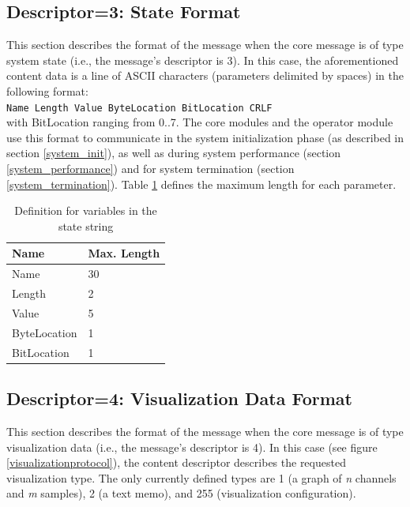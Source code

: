 \documentclass[letterpaper,oneside,12pt]{book}
\newcommand{\todo}[1]{}
\begin{document}
\todo{Describe proposal for parameter data type for state definition, e.g.,
TargetCode 1 Feedback 1}

\subsection{Descriptor=3: State Format}
\label{state_format}

This section describes the format of the message when the core message is of 
type system state (i.e., the message's descriptor is 3). In this case, the 
aforementioned content data is a line of ASCII characters (parameters
delimited by spaces) in the following format:
\\[2ex]
\verb|Name Length Value ByteLocation BitLocation CRLF|
\\[2ex]
with BitLocation ranging from 0..7.
The core modules and the operator module use this format to communicate in 
the system initialization phase (as described in section \ref{system_init}), 
as well as during system performance (section \ref{system_performance}) and 
for system termination (section \ref{system_termination}). Table 
\ref{state_table} defines the maximum length for each parameter.

\begin{table}[ht]
 \centering
 \begin{tabular}{|l|l|}
  \hline
  \textbf{Name} & \textbf{Max. Length} \\
  \hline
  Name & 30 \\
  \hline
  Length & 2 \\
  \hline
  Value & 5 \\
  \hline
  ByteLocation & 1 \\
  \hline
  BitLocation & 1 \\
  \hline
 \end{tabular}
 \caption{Definition for variables in the state string}
 \label{state_table}
\end{table}   

\subsection{Descriptor=4: Visualization Data Format}
\label{visualizationdata_format}

This section describes the format of the message when the core message is of 
type visualization data (i.e., the message's descriptor is 4). In this case (see 
figure \ref{visualizationprotocol}), the content descriptor describes the 
requested visualization type. The only currently defined types are 1 (a graph of 
\textit{n} channels and \textit{m} samples), 2 (a text memo), and 255 
(visualization configuration).
\end{document}
